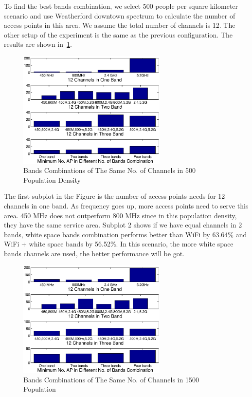 To find the best bands combination, we select 500 people per square kilometer scenario and use Weatherford 
downtown spectrum to calculate the number of access points in this area. We assume the total number of channels 
is 12. The other setup of the experiment is 
the same as the previous configuration. The results are shown in~\ref{fig:varybandcomb}.
   \begin{figure}
   \centering
   \includegraphics[width=74mm]{figures/varybandcomb}
   \vspace{-0.1in}
   \caption{Bands Combinations of The Same No. of Channels in 500 Population Density}                                                                 
   \label{fig:varybandcomb}
   \end{figure}

The first subplot in the Figure is the number of access points needs for 12 channels in one band.
As frequency goes up, more access points need to serve this area. 450 MHz does not outperform 
800 MHz since in this population density, they have the same service area.
Subplot 2 shows if we have equal channels in 2 bands, white space bands combination performs better
than WiFi by 63.64\% and WiFi + white space bands by 56.52\%. In this scenario, the more white space bands channels are 
used, the better performance will be got.

   \begin{figure}
   \centering
   \includegraphics[width=74mm]{figures/varybandcomb2}
   \vspace{-0.1in}
   \caption{Bands Combinations of The Same No. of Channels in 1500 Population} 
   \label{fig:varybandcomb2}
   \end{figure}

